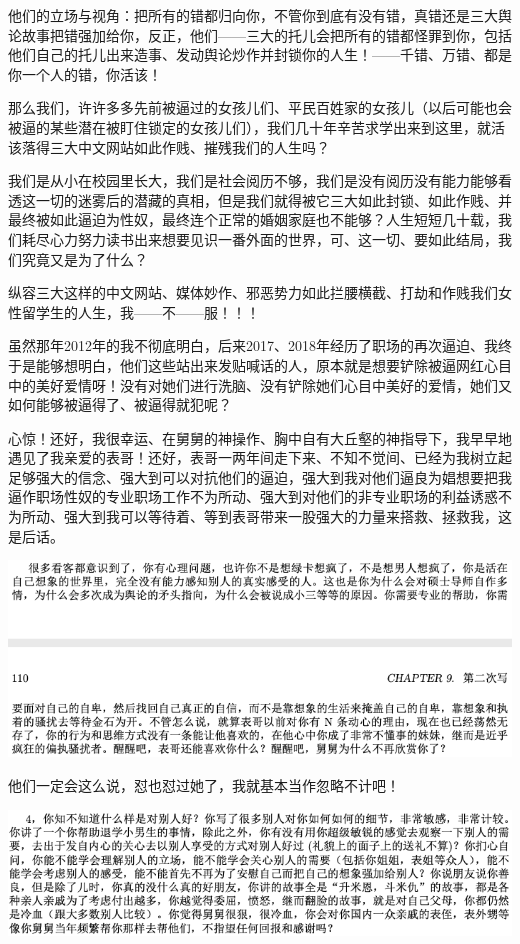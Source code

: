 \documentclass[9pt, b5paper]{article}
\begin{document}
他们的立场与视角：把所有的错都归向你，不管你到底有没有错，真错还是三大舆论故事把错强加给你，反正，他们——三大的托儿会把所有的错都怪罪到你，包括他们自己的托儿出来造事、发动舆论炒作并封锁你的人生！——千错、万错、都是你一个人的错，你活该！

那么我们，许许多多先前被逼过的女孩儿们、平民百姓家的女孩儿（以后可能也会被逼的某些潜在被盯住锁定的女孩儿们），我们几十年辛苦求学出来到这里，就活该落得三大中文网站如此作贱、摧残我们的人生吗？

我们是从小在校园里长大，我们是社会阅历不够，我们是没有阅历没有能力能够看透这一切的迷雾后的潜藏的真相，但是我们就得被它三大如此封锁、如此作贱、并最终被如此逼迫为性奴，最终连个正常的婚姻家庭也不能够？人生短短几十载，我们耗尽心力努力读书出来想要见识一番外面的世界，可、这一切、要如此结局，我们究竟又是为了什么？

纵容三大这样的中文网站、媒体妙作、邪恶势力如此拦腰横截、打劫和作贱我们女性留学生的人生，我——不——服！！！

虽然那年2012年的我不彻底明白，后来2017、2018年经历了职场的再次逼迫、我终于是能够想明白，他们这些站出来发贴喊话的人，原本就是想要铲除被逼网红心目中的美好爱情呀！没有对她们进行洗脑、没有铲除她们心目中美好的爱情，她们又如何能够被逼得了、被逼得就犯呢？

心惊！还好，我很幸运、在舅舅的神操作、胸中自有大丘壑的神指导下，我早早地遇见了我亲爱的表哥！还好，表哥一两年间走下来、不知不觉间、已经为我树立起足够强大的信念、强大到可以对抗他们的逼迫，强大到我对他们逼良为娼想要把我逼作职场性奴的专业职场工作不为所动、强大到对他们的非专业职场的利益诱惑不为所动、强大到我可以等待着、等到表哥带来一股强大的力量来搭救、拯救我，这是后话。 

\begin{center}
\includegraphics[width=.9\linewidth]{./pic/p1p109-6.png}
\end{center}

他们一定会这么说，怼也怼过她了，我就基本当作忽略不计吧！

\begin{center}
\includegraphics[width=.9\linewidth]{./pic/p1p110-1.png}
\end{center}
\end{document}

